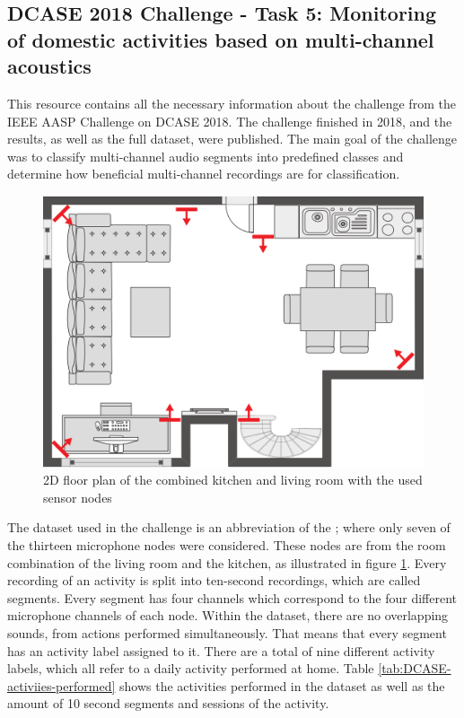 \subsection[DCASE 2018 Challenge - Task 5 dataset]{DCASE 2018 Challenge - Task 5: Monitoring of domestic activities based on multi-channel acoustics }
\label{sub:DCASE-Task-Dataset}
This resource contains all the necessary information about the challenge from the IEEE AASP Challenge on \gls{DCASE} 2018. The challenge finished in 2018, and the results, as well as the full dataset, were published. The main goal of the challenge was to classify multi-channel audio segments into predefined classes and determine how beneficial multi-channel recordings are for classification. 

\begin{figure}[htbp]
	\centering
	\includegraphics[scale=0.8]{baa-documentation/img/DCASE_floor_map.png}
	\caption[2D floor plan of the combined kitchen and living room with the used sensor nodes]{2D floor plan of the combined kitchen and living room with the used sensor nodes \footnotemark}
	\label{fig:dcase-recordings-floor-plan}
\end{figure}
\noindent
The dataset used in the challenge is an abbreviation of the ; where only seven of the thirteen microphone nodes were considered. These nodes are from the room combination of the living room and the kitchen, as illustrated in figure \ref{fig:dcase-recordings-floor-plan}. Every recording of an activity is split into ten-second recordings, which are called segments. Every segment has four channels which correspond to the four different microphone channels of each node. Within the dataset, there are no overlapping sounds, from actions performed simultaneously. That means that every segment has an activity label assigned to it. There are a total of nine different activity labels, which all refer to a daily activity performed at home. Table \ref{tab:DCASE-activiies-performed} shows the activities performed in the dataset as well as the amount of 10 second segments and sessions of the activity.

